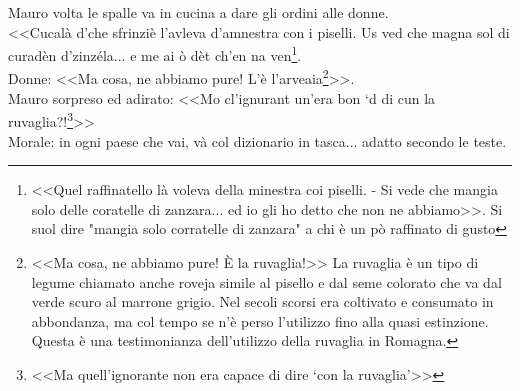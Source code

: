 \indent Mauro volta le spalle va in cucina a dare gli ordini alle donne. \\
\indent <<Cucalà d'che sfrinziè l'avleva d'amnestra con i piselli. Us ved che magna sol di curadèn d'zinzéla... e me ai ò dèt ch'en na ven\footnote{<<Quel raffinatello là voleva della minestra coi piselli. - Si vede che mangia solo delle coratelle di zanzara... ed io gli ho detto che non ne abbiamo>>. Si suol dire "mangia solo corratelle di zanzara" a chi è un pò raffinato di gusto}. \\
\indent Donne: <<Ma cosa, ne abbiamo pure! L'è l'arveaia\footnote{<<Ma cosa, ne abbiamo pure! È la ruvaglia!>> La ruvaglia è un tipo di legume chiamato anche roveja simile al pisello e dal seme colorato che va dal verde scuro al marrone grigio. Nel secoli scorsi era coltivato e consumato in abbondanza, ma col tempo se n'è perso l'utilizzo fino alla quasi estinzione. Questa è una testimonianza dell'utilizzo della ruvaglia in Romagna.}>>.\\
\indent Mauro sorpreso ed adirato: <<Mo cl'ignurant un'era bon `d di cun la ruvaglia?!\footnote{<<Ma quell'ignorante non era capace di dire `con la ruvaglia'>>}>>\\
\indent Morale: in ogni paese che vai, và col dizionario in tasca... adatto secondo le teste.

